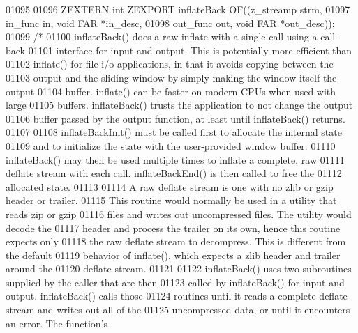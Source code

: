 \begin{DoxyCode}
01095 
01096 ZEXTERN \textcolor{keywordtype}{int} ZEXPORT inflateBack OF((z\_streamp strm,
01097                                     in\_func in, \textcolor{keywordtype}{void} FAR *in\_desc,
01098                                     out\_func out, \textcolor{keywordtype}{void} FAR *out\_desc));
01099 \textcolor{comment}{/*}
01100 \textcolor{comment}{     inflateBack() does a raw inflate with a single call using a call-back}
01101 \textcolor{comment}{   interface for input and output.  This is potentially more efficient than}
01102 \textcolor{comment}{   inflate() for file i/o applications, in that it avoids copying between the}
01103 \textcolor{comment}{   output and the sliding window by simply making the window itself the output}
01104 \textcolor{comment}{   buffer.  inflate() can be faster on modern CPUs when used with large}
01105 \textcolor{comment}{   buffers.  inflateBack() trusts the application to not change the output}
01106 \textcolor{comment}{   buffer passed by the output function, at least until inflateBack() returns.}
01107 \textcolor{comment}{}
01108 \textcolor{comment}{     inflateBackInit() must be called first to allocate the internal state}
01109 \textcolor{comment}{   and to initialize the state with the user-provided window buffer.}
01110 \textcolor{comment}{   inflateBack() may then be used multiple times to inflate a complete, raw}
01111 \textcolor{comment}{   deflate stream with each call.  inflateBackEnd() is then called to free the}
01112 \textcolor{comment}{   allocated state.}
01113 \textcolor{comment}{}
01114 \textcolor{comment}{     A raw deflate stream is one with no zlib or gzip header or trailer.}
01115 \textcolor{comment}{   This routine would normally be used in a utility that reads zip or gzip}
01116 \textcolor{comment}{   files and writes out uncompressed files.  The utility would decode the}
01117 \textcolor{comment}{   header and process the trailer on its own, hence this routine expects only}
01118 \textcolor{comment}{   the raw deflate stream to decompress.  This is different from the default}
01119 \textcolor{comment}{   behavior of inflate(), which expects a zlib header and trailer around the}
01120 \textcolor{comment}{   deflate stream.}
01121 \textcolor{comment}{}
01122 \textcolor{comment}{     inflateBack() uses two subroutines supplied by the caller that are then}
01123 \textcolor{comment}{   called by inflateBack() for input and output.  inflateBack() calls those}
01124 \textcolor{comment}{   routines until it reads a complete deflate stream and writes out all of the}
01125 \textcolor{comment}{   uncompressed data, or until it encounters an error.  The function's}

\end{DoxyCode}
